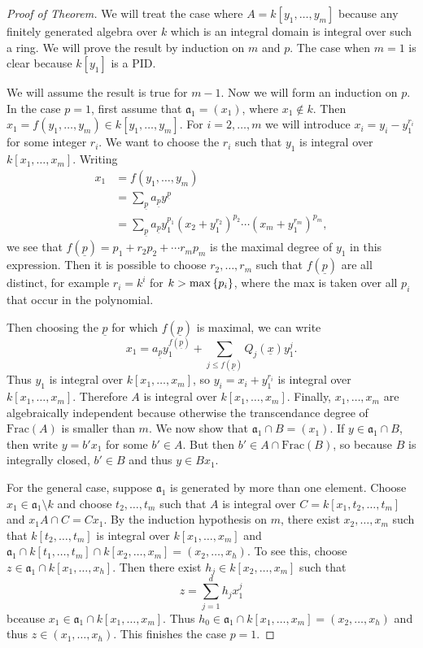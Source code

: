 \documentclass[leqno, openany]{memoir}
\theoremstyle{definition}
\theoremstyle{remark}
\theoremstyle{plain}
\theoremstyle{definition}
\theoremstyle{remark}
\newcommand{\mf}[1]{\mathfrak{#1}}
\newcommand{\mr}[1]{\mathrm{#1}}
\newcommand{\ul}[1]{\underline{#1}}
\begin{document}
\begin{proof}[Proof of Theorem]
    We will treat the case where $A = k[y_1, \ldots, y_m]$ because any finitely generated algebra over $k$ which is an integral domain is integral over such a ring. We will prove the result by induction on $m$ and $p$. The case when $m = 1$ is clear because $k[y_1]$ is a PID.

    We will assume the result is true for $m-1$. Now we will form an induction on $p$. In the case $p=1$, first assume that $\mf{a}_1 = (x_1)$, where $x_1 \notin k$. Then $x_1 = f(y_1, \ldots, y_m) \in k[y_1, \ldots, y_m]$. For $i = 2, \ldots, m$ we will introduce $x_i = y_i - y_1^{r_i}$ for some integer $r_i$. We want to choose the $r_i$ such that $y_1$ is integral over $k[x_1, \ldots, x_m]$. Writing
    \begin{align*} 
        x_1 &= f(y_1, \ldots, y_m) \\
            &= \sum_{\ul{p}} a_{\ul{p}} y^{\ul{p}} \\
            &= \sum_{\ul{p}} a_{\ul{p}} y_1^{p_1} (x_2 + y_1^{r_2})^{p_2} \cdots (x_m + y_1^{r_m})^{p_m}, 
    \end{align*}
    we see that $f(\ul{p}) = p_1 + r_2 p_2 + \cdots r_m p_m$ is the maximal degree of $y_1$ in this expression. Then it is possible to choose $r_2, \ldots, r_m$ such that $f(\ul{p})$ are all distinct, for example $r_i = k^i$ for $k > \max \qty{p_i}$, where the max is taken over all $p_i$ that occur in the polynomial.

    Then choosing the $\ul{p}$ for which $f(\ul{p})$ is maximal, we can write
    \[ x_1 = a_{\ul{p}} y_1^{f(\ul{p})} + \sum_{j \leq f(\ul{p})} Q_j(\ul{x}) y_1^j. \]
    Thus $y_1$ is integral over $k[x_1, \ldots, x_m]$, so $y_i = x_i + y_1^{r_i}$ is integral over $k[x_1, \ldots, x_m]$. Therefore $A$ is integral over $k[x_1, \ldots, x_m]$. Finally, $x_1, \ldots, x_m$ are algebraically independent because otherwise the transcendance degree of $\mr{Frac}(A)$ is smaller than $m$. We now show that $\mf{a}_1 \cap B = (x_1)$. If $y \in \mf{a}_1 \cap B$, then write $y = b'x_1$ for some $b' \in A$. But then $b' \in A \cap \mr{Frac}(B)$, so because $B$ is integrally closed, $b' \in B$ and thus $y \in B x_1$.

    For the general case, suppose $\mf{a}_1$ is generated by more than one element. Choose $x_1 \in \mf{a}_1 \setminus k$ and choose $t_2, \ldots, t_m$ such that $A$ is integral over $C = k[x_1, t_2, \ldots, t_m]$ and $x_1 A \cap C = C x_1$. By the induction hypothesis on $m$, there exist $x_2, \ldots, x_m$ such that $k[t_2, \ldots, t_m]$ is integral over $k[x_1, \ldots, x_m]$ and $\mf{a_1} \cap k[t_1, \ldots, t_m] \cap k[x_2, \ldots, x_m] = (x_2, \ldots, x_h)$. To see this, choose $z \in \mf{a}_1 \cap k[x_1, \ldots, x_h]$. Then there exist $h_j \in k[x_2, \ldots, x_m]$ such that
    \[ z = \sum_{j=1}^d h_j x_1^j \]
    bceause $x_1 \in \mf{a}_1 \cap k[x_1, \ldots, x_m]$. Thus $h_0 \in \mf{a}_1 \cap k[x_1, \ldots, x_m] = (x_2, \ldots, x_h)$ and thus $z \in (x_1, \ldots, x_h)$. This finishes the case $p = 1$.


\end{proof}
\end{document}
